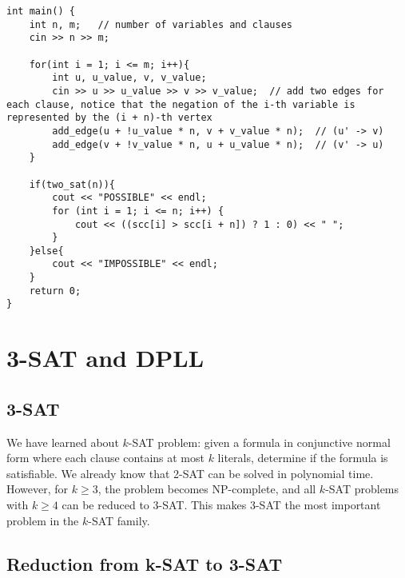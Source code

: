 \documentclass[a4paper,12pt]{article}
\newenvironment{claim}[1]{\par\noindent\underline{Claim:}\space#1}{}
\begin{document}
\begin{verbatim}
int main() {
    int n, m;   // number of variables and clauses
    cin >> n >> m;

    for(int i = 1; i <= m; i++){
        int u, u_value, v, v_value;
        cin >> u >> u_value >> v >> v_value;  // add two edges for each clause, notice that the negation of the i-th variable is represented by the (i + n)-th vertex
        add_edge(u + !u_value * n, v + v_value * n);  // (u' -> v)
        add_edge(v + !v_value * n, u + u_value * n);  // (v' -> u)
    }

    if(two_sat(n)){
        cout << "POSSIBLE" << endl;
        for (int i = 1; i <= n; i++) {
            cout << ((scc[i] > scc[i + n]) ? 1 : 0) << " ";  
        }
    }else{
        cout << "IMPOSSIBLE" << endl;
    }
    return 0;
}
\end{verbatim}

\section{3-SAT and DPLL}

\subsection{3-SAT}

We have learned about $k$-SAT problem: given a formula in conjunctive normal form where each clause contains at most $k$ literals, determine if the formula is satisfiable.
We already know that 2-SAT can be solved in polynomial time.
However, for $k \geq 3$, the problem becomes NP-complete, and all $k$-SAT problems with $k \geq 4$ can be reduced to 3-SAT.
This makes 3-SAT the most important problem in the $k$-SAT family.

\subsection{Reduction from k-SAT to 3-SAT}

\end{document}

